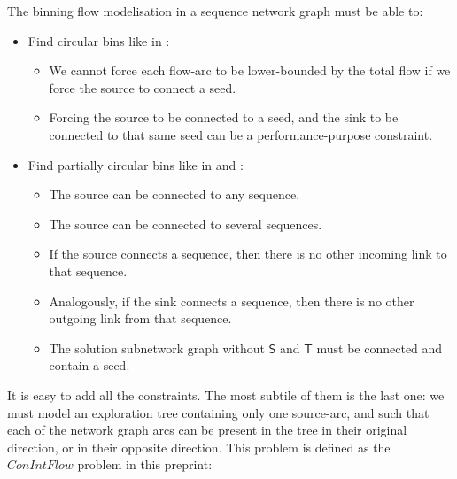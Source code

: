 The binning flow modelisation in a sequence network graph must be able to:

\begin{itemize}
  \item Find circular bins like in :
    \begin{itemize}
      \item We cannot force each flow-arc to be lower-bounded by the total flow if we force the source to connect a seed.
      \item Forcing the source to be connected to a seed, and the sink to be connected to that same seed can be a performance-purpose constraint.
    \end{itemize}
  \item Find partially circular bins like in  and :
    \begin{itemize}
      \item The source can be connected to any sequence.
      \item The source can be connected to several sequences.
      \item If the source connects a sequence, then there is no other incoming link to that sequence.
      \item Analogously, if the sink connects a sequence, then there is no other outgoing link from that sequence.
      \item The solution subnetwork graph without \(\mathsf{S}\) and \(\mathsf{T}\) must be connected and contain a seed.
    \end{itemize}
\end{itemize}

It is easy to add all the constraints.
The most subtile of them is the last one: we must model an exploration tree containing only one source-arc, and such that each of the network graph arcs can be present in the tree in their original direction, or in their opposite direction.
This problem is defined as the \(ConIntFlow\) problem in this preprint:~\cite{epainMixedIntegerLinear2025}